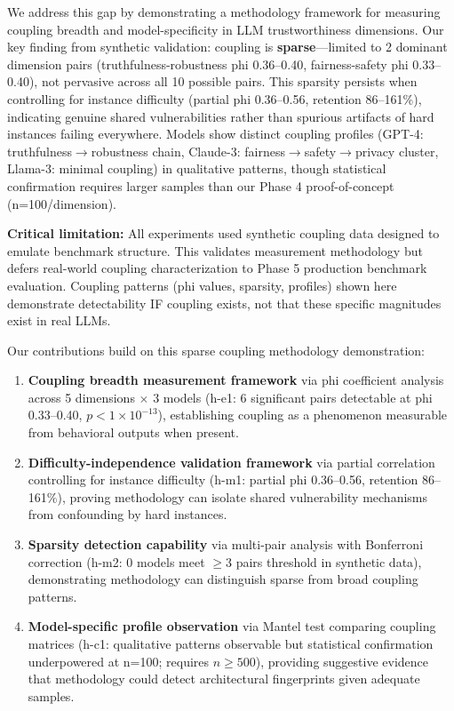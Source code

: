 We address this gap by demonstrating a methodology framework for measuring coupling breadth and model-specificity in LLM trustworthiness dimensions. Our key finding from synthetic validation: coupling is \textbf{sparse}---limited to 2 dominant dimension pairs (truthfulness-robustness phi 0.36--0.40, fairness-safety phi 0.33--0.40), not pervasive across all 10 possible pairs. This sparsity persists when controlling for instance difficulty (partial phi 0.36--0.56, retention 86--161\%), indicating genuine shared vulnerabilities rather than spurious artifacts of hard instances failing everywhere. Models show distinct coupling profiles (GPT-4: truthfulness$\rightarrow$robustness chain, Claude-3: fairness$\rightarrow$safety$\rightarrow$privacy cluster, Llama-3: minimal coupling) in qualitative patterns, though statistical confirmation requires larger samples than our Phase 4 proof-of-concept (n=100/dimension).

\textbf{Critical limitation:} All experiments used synthetic coupling data designed to emulate benchmark structure. This validates measurement methodology but defers real-world coupling characterization to Phase 5 production benchmark evaluation. Coupling patterns (phi values, sparsity, profiles) shown here demonstrate detectability IF coupling exists, not that these specific magnitudes exist in real LLMs.

Our contributions build on this sparse coupling methodology demonstration:

\begin{enumerate}
\item \textbf{Coupling breadth measurement framework} via phi coefficient analysis across 5 dimensions $\times$ 3 models (h-e1: 6 significant pairs detectable at phi 0.33--0.40, $p < 1\times10^{-13}$), establishing coupling as a phenomenon measurable from behavioral outputs when present.

\item \textbf{Difficulty-independence validation framework} via partial correlation controlling for instance difficulty (h-m1: partial phi 0.36--0.56, retention 86--161\%), proving methodology can isolate shared vulnerability mechanisms from confounding by hard instances.

\item \textbf{Sparsity detection capability} via multi-pair analysis with Bonferroni correction (h-m2: 0 models meet $\geq$3 pairs threshold in synthetic data), demonstrating methodology can distinguish sparse from broad coupling patterns.

\item \textbf{Model-specific profile observation} via Mantel test comparing coupling matrices (h-c1: qualitative patterns observable but statistical confirmation underpowered at n=100; requires $n \geq 500$), providing suggestive evidence that methodology could detect architectural fingerprints given adequate samples.
\end{enumerate}

